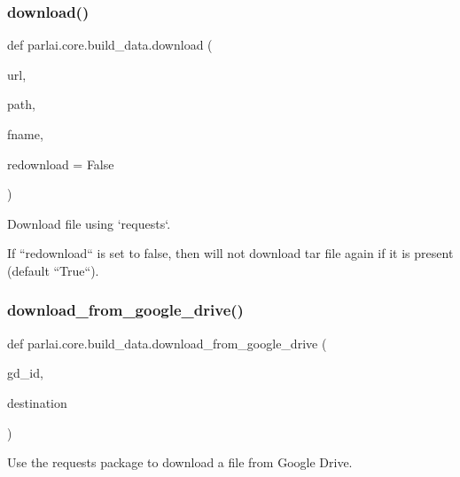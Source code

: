 \subsubsection{\texorpdfstring{download()}{download()}}
{\footnotesize\ttfamily def parlai.\+core.\+build\+\_\+data.\+download (\begin{DoxyParamCaption}\item[{}]{url,  }\item[{}]{path,  }\item[{}]{fname,  }\item[{}]{redownload = {\ttfamily False} }\end{DoxyParamCaption})}

\begin{DoxyVerb}Download file using `requests`.

If ``redownload`` is set to false, then will not download tar file again if it is
present (default ``True``).
\end{DoxyVerb}
 \mbox{\label{namespaceparlai_1_1core_1_1build__data_ac9224da5c4e4ce9d1f4ab05e837c1f45}} 
\subsubsection{\texorpdfstring{download\+\_\+from\+\_\+google\+\_\+drive()}{download\_from\_google\_drive()}}
{\footnotesize\ttfamily def parlai.\+core.\+build\+\_\+data.\+download\+\_\+from\+\_\+google\+\_\+drive (\begin{DoxyParamCaption}\item[{}]{gd\+\_\+id,  }\item[{}]{destination }\end{DoxyParamCaption})}

\begin{DoxyVerb}Use the requests package to download a file from Google Drive.
\end{DoxyVerb}
 \mbox{\label{namespaceparlai_1_1core_1_1build__data_ab697f23f05d3e36d7979fe5e0ed7911e}} 
